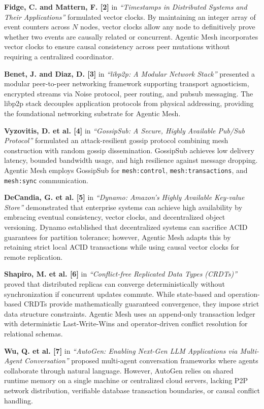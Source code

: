 \documentclass[12pt,a4paper]{report}
\begin{document}
\noindent
\textbf{Fidge, C. and Mattern, F. [2]} in \textit{“Timestamps in Distributed Systems and Their Applications”} formulated vector clocks. By maintaining an integer array of event counters across $N$ nodes, vector clocks allow any node to definitively prove whether two events are causally related or concurrent. Agentic Mesh incorporates vector clocks to ensure causal consistency across peer mutations without requiring a centralized coordinator.

\noindent
\textbf{Benet, J. and Diaz, D. [3]} in \textit{“libp2p: A Modular Network Stack”} presented a modular peer-to-peer networking framework supporting transport agnosticism, encrypted streams via Noise protocol, peer routing, and pubsub messaging. The libp2p stack decouples application protocols from physical addressing, providing the foundational networking substrate for Agentic Mesh.

\noindent
\textbf{Vyzovitis, D. et al. [4]} in \textit{“GossipSub: A Secure, Highly Available Pub/Sub Protocol”} formulated an attack-resilient gossip protocol combining mesh construction with random gossip dissemination. GossipSub achieves low delivery latency, bounded bandwidth usage, and high resilience against message dropping. Agentic Mesh employs GossipSub for \texttt{mesh:control}, \texttt{mesh:transactions}, and \texttt{mesh:sync} communication.

\noindent
\textbf{DeCandia, G. et al. [5]} in \textit{“Dynamo: Amazon’s Highly Available Key-value Store”} demonstrated that enterprise systems can achieve high availability by embracing eventual consistency, vector clocks, and decentralized object versioning. Dynamo established that decentralized systems can sacrifice ACID guarantees for partition tolerance; however, Agentic Mesh adapts this by retaining strict local ACID transactions while using causal vector clocks for remote replication.

\noindent
\textbf{Shapiro, M. et al. [6]} in \textit{“Conflict-free Replicated Data Types (CRDTs)”} proved that distributed replicas can converge deterministically without synchronization if concurrent updates commute. While state-based and operation-based CRDTs provide mathematically guaranteed convergence, they impose strict data structure constraints. Agentic Mesh uses an append-only transaction ledger with deterministic Last-Write-Wins and operator-driven conflict resolution for relational schemas.

\noindent
\textbf{Wu, Q. et al. [7]} in \textit{“AutoGen: Enabling Next-Gen LLM Applications via Multi-Agent Conversation”} proposed multi-agent conversation frameworks where agents collaborate through natural language. However, AutoGen relies on shared runtime memory on a single machine or centralized cloud servers, lacking P2P network distribution, verifiable database transaction boundaries, or causal conflict handling.
\end{document}
